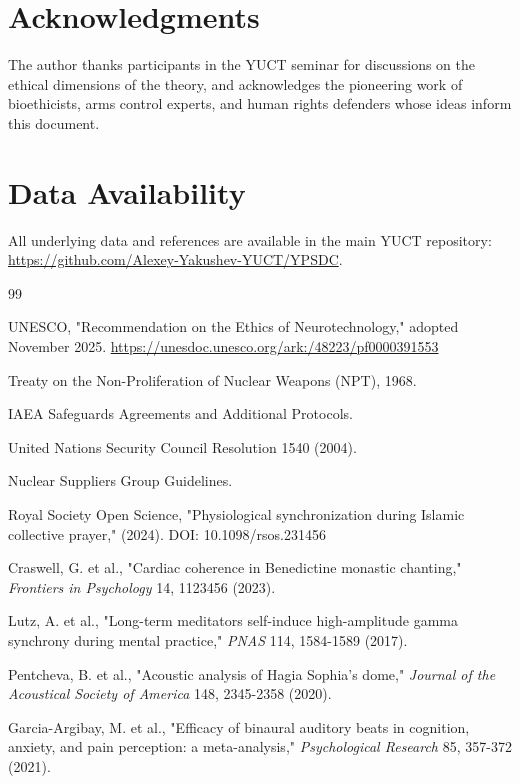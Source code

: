 \documentclass[12pt,a4paper]{article}
\theoremstyle{remark}
\begin{document}
	\section*{Acknowledgments}
	The author thanks participants in the YUCT seminar for discussions on the ethical dimensions of the theory, and acknowledges the pioneering work of bioethicists, arms control experts, and human rights defenders whose ideas inform this document.
	
	\section*{Data Availability}
	All underlying data and references are available in the main YUCT repository: \url{https://github.com/Alexey-Yakushev-YUCT/YPSDC}.
	
	\begin{thebibliography}{99}
		
		UNESCO, "Recommendation on the Ethics of Neurotechnology," adopted November 2025. 
		\url{https://unesdoc.unesco.org/ark:/48223/pf0000391553}
		
		Treaty on the Non-Proliferation of Nuclear Weapons (NPT), 1968.
		
		IAEA Safeguards Agreements and Additional Protocols.
		
		United Nations Security Council Resolution 1540 (2004).
		
		Nuclear Suppliers Group Guidelines.
		
		Royal Society Open Science, "Physiological synchronization during Islamic collective prayer," (2024). DOI: 10.1098/rsos.231456
		
		Craswell, G. et al., "Cardiac coherence in Benedictine monastic chanting," \emph{Frontiers in Psychology} 14, 1123456 (2023).
		
		Lutz, A. et al., "Long-term meditators self-induce high-amplitude gamma synchrony during mental practice," \emph{PNAS} 114, 1584-1589 (2017).
		
		Pentcheva, B. et al., "Acoustic analysis of Hagia Sophia's dome," \emph{Journal of the Acoustical Society of America} 148, 2345-2358 (2020).
		
		Garcia-Argibay, M. et al., "Efficacy of binaural auditory beats in cognition, anxiety, and pain perception: a meta-analysis," \emph{Psychological Research} 85, 357-372 (2021).
		
	\end{thebibliography}
	
\end{document}
